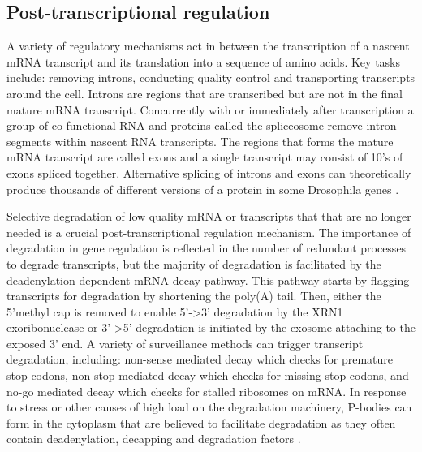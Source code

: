 \documentclass[../main.tex]{subfiles}
\begin{document}
\subsection{Post-transcriptional regulation}

A variety of regulatory mechanisms act in between the transcription of a nascent mRNA transcript and its translation into a sequence of amino acids.
Key tasks include: removing introns, conducting quality control and transporting transcripts around the cell.
Introns are regions that are transcribed but are not in the final mature mRNA transcript.
Concurrently with or immediately after transcription a group of co-functional RNA and proteins called the spliceosome remove intron segments within nascent RNA transcripts.
The regions that forms the mature mRNA transcript are called exons and a single transcript may consist of 10's of exons spliced together.
Alternative splicing of introns and exons can theoretically produce thousands of different versions of a protein in some Drosophila genes \parencite{Wilkinson2020}.

Selective degradation of low quality mRNA or transcripts that that are no longer needed is a crucial post-transcriptional regulation mechanism.
The importance of degradation in gene regulation is reflected in the number of redundant processes to degrade transcripts, but the majority of degradation is facilitated by the deadenylation-dependent mRNA decay pathway.
This pathway starts by flagging transcripts for degradation by shortening  the poly(A) tail.
Then, either the 5'methyl cap is removed to enable 5'->3' degradation by the XRN1 exoribonuclease or 3'->5' degradation is initiated by the exosome attaching to the exposed 3' end. 
A variety of surveillance methods can trigger transcript degradation, including: non-sense mediated decay which checks for premature stop codons, non-stop mediated decay which checks for missing stop codons, and no-go mediated decay which checks for stalled ribosomes on mRNA.
In response to stress or other causes of high load on the degradation machinery, P-bodies can form in the cytoplasm that are believed to facilitate degradation as they often contain deadenylation, decapping and degradation factors \parencite{Garneau2007}.
\end{document}

